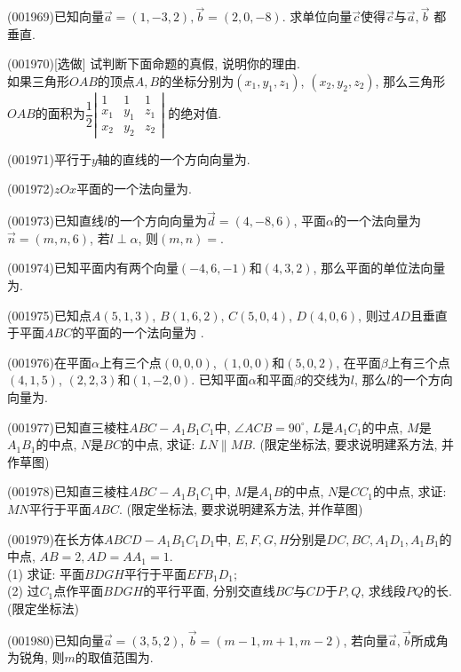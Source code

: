 \item (001969)已知向量$\overrightarrow{a}=(1,-3,2),\overrightarrow{b}=(2,0,-8)$. 求单位向量$\overrightarrow{c}$使得$\overrightarrow{c}$与$\overrightarrow{a},\overrightarrow{b}$
都垂直.
\item (001970)[选做]
试判断下面命题的真假, 说明你的理由.\\ 
如果三角形$OAB$的顶点$A,B$的坐标分别为$(x_1,y_1,z_1)$, $(x_2,y_2,z_2)$, 那么三角形$OAB$的面积为$\dfrac{1}{2}\left|\begin{array}{ccc}1&1&1\\x_1&y_1&z_1\\x_2&y_2&z_2\end{array}\right|$ 的绝对值.
\item (001971)平行于$y$轴的直线的一个方向向量为.
\item (001972)$zOx$平面的一个法向量为.
\item (001973)已知直线$l$的一个方向向量为$\overrightarrow{d}=(4,-8,6)$, 平面$\alpha$的一个法向量为$\overrightarrow{n}=(m,n,6)$, 若$l\perp \alpha$, 则$(m,n)=$.
\item (001974)已知平面内有两个向量$(-4,6,-1)$和$(4,3,2)$, 那么平面的单位法向量为.
\item (001975)已知点$A(5,1,3)$, $B(1,6,2)$, $C(5,0,4)$, $D(4,0,6)$, 则过$AD$且垂直于平面$ABC$的平面的一个法向量为
.
\item (001976)在平面$\alpha$上有三个点$(0,0,0)$, $(1,0,0)$和$(5,0,2)$, 在平面$\beta$上有三个点$(4,1,5)$, $(2,2,3)$和$(1,-2,0)$. 已知平面$\alpha$和平面$\beta$的交线为$l$, 那么$l$的一个方向向量为.
\item (001977)已知直三棱柱$ABC-A_1B_1C_1$中, $\angle ACB=90^\circ$, $L$是$A_1C_1$的中点, $M$是$A_1B_1$的中点,
$N$是$BC$的中点, 求证: $LN\parallel MB$. (限定坐标法, 要求说明建系方法, 并作草图)
\item (001978)已知直三棱柱$ABC-A_1B_1C_1$中, $M$是$A_1B$的中点, $N$是$CC_1$的中点,
求证: $MN$平行于平面$ABC$. (限定坐标法, 要求说明建系方法, 并作草图)
\item (001979)在长方体$ABCD-A_1B_1C_1D_1$中, $E,F,G,H$分别是$DC,BC,A_1D_1,A_1B_1$的中点, $AB=2,AD=AA_1=1$.\\ 
(1) 求证: 平面$BDGH$平行于平面$EFB_1D_1$;\\ 
(2) 过$C_1$点作平面$BDGH$的平行平面, 分别交直线$BC$与$CD$于$P,Q$, 求线段$PQ$的长. (限定坐标法)
\item (001980)已知向量$\overrightarrow{a}=(3,5,2)$, $\overrightarrow{b}=(m-1,m+1,m-2)$, 若向量$\overrightarrow{a},\overrightarrow{b}$所成角为锐角, 则$m$的取值范围为.

